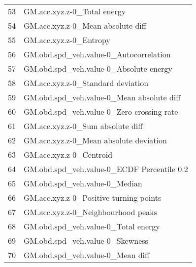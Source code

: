 \begin{tabular}{ll}
53 &                       GM.acc.xyz.z-0\_Total energy \\
54 &                 GM.acc.xyz.z-0\_Mean absolute diff \\
55 &                            GM.acc.xyz.z-0\_Entropy \\
56 &            GM.obd.spd\_veh.value-0\_Autocorrelation \\
57 &            GM.obd.spd\_veh.value-0\_Absolute energy \\
58 &                 GM.acc.xyz.z-0\_Standard deviation \\
59 &         GM.obd.spd\_veh.value-0\_Mean absolute diff \\
60 &         GM.obd.spd\_veh.value-0\_Zero crossing rate \\
61 &                  GM.acc.xyz.z-0\_Sum absolute diff \\
62 &            GM.acc.xyz.z-0\_Mean absolute deviation \\
63 &                           GM.acc.xyz.z-0\_Centroid \\
64 &        GM.obd.spd\_veh.value-0\_ECDF Percentile 0.2 \\
65 &                     GM.obd.spd\_veh.value-0\_Median \\
66 &            GM.acc.xyz.z-0\_Positive turning points \\
67 &                GM.acc.xyz.z-0\_Neighbourhood peaks \\
68 &               GM.obd.spd\_veh.value-0\_Total energy \\
69 &                   GM.obd.spd\_veh.value-0\_Skewness \\
70 &                  GM.obd.spd\_veh.value-0\_Mean diff \\
\bottomrule
\end{tabular}

